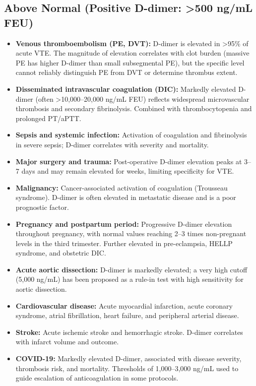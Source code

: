 \subsection*{Above Normal (Positive D-dimer: >500 ng/mL FEU)}
\begin{itemize}
  \item \textbf{Venous thromboembolism (PE, DVT):} D-dimer is elevated in >95\% of acute VTE. The magnitude of elevation correlates with clot burden (massive PE has higher D-dimer than small subsegmental PE), but the specific level cannot reliably distinguish PE from DVT or determine thrombus extent.
  \item \textbf{Disseminated intravascular coagulation (DIC):} Markedly elevated D-dimer (often >10,000--20,000 ng/mL FEU) reflects widespread microvascular thrombosis and secondary fibrinolysis. Combined with thrombocytopenia and prolonged PT/aPTT.
  \item \textbf{Sepsis and systemic infection:} Activation of coagulation and fibrinolysis in severe sepsis; D-dimer correlates with severity and mortality.
  \item \textbf{Major surgery and trauma:} Post-operative D-dimer elevation peaks at 3--7 days and may remain elevated for weeks, limiting specificity for VTE.
  \item \textbf{Malignancy:} Cancer-associated activation of coagulation (Trousseau syndrome). D-dimer is often elevated in metastatic disease and is a poor prognostic factor.
  \item \textbf{Pregnancy and postpartum period:} Progressive D-dimer elevation throughout pregnancy, with normal values reaching 2--3 times non-pregnant levels in the third trimester. Further elevated in pre-eclampsia, HELLP syndrome, and obstetric DIC.
  \item \textbf{Acute aortic dissection:} D-dimer is markedly elevated; a very high cutoff (5,000 ng/mL) has been proposed as a rule-in test with high sensitivity for aortic dissection.
  \item \textbf{Cardiovascular disease:} Acute myocardial infarction, acute coronary syndrome, atrial fibrillation, heart failure, and peripheral arterial disease.
  \item \textbf{Stroke:} Acute ischemic stroke and hemorrhagic stroke. D-dimer correlates with infarct volume and outcome.
  \item \textbf{COVID-19:} Markedly elevated D-dimer, associated with disease severity, thrombosis risk, and mortality. Thresholds of 1,000--3,000 ng/mL used to guide escalation of anticoagulation in some protocols.

\end{itemize}
